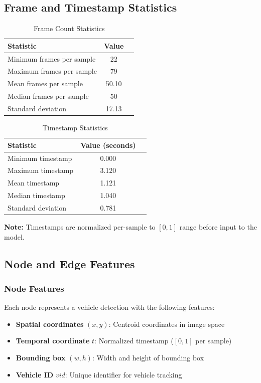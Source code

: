 \documentclass[11pt,a4paper]{article}
\begin{document}
\subsection{Frame and Timestamp Statistics}

\begin{table}[H]
\centering
\caption{Frame Count Statistics}
\begin{tabular}{lcc}
\toprule
\textbf{Statistic} & \textbf{Value} \\
\midrule
Minimum frames per sample & 22 \\
Maximum frames per sample & 79 \\
Mean frames per sample & 50.10 \\
Median frames per sample & 50 \\
Standard deviation & 17.13 \\
\bottomrule
\end{tabular}
\end{table}

\begin{table}[H]
\centering
\caption{Timestamp Statistics}
\begin{tabular}{lcc}
\toprule
\textbf{Statistic} & \textbf{Value (seconds)} \\
\midrule
Minimum timestamp & 0.000 \\
Maximum timestamp & 3.120 \\
Mean timestamp & 1.121 \\
Median timestamp & 1.040 \\
Standard deviation & 0.781 \\
\bottomrule
\end{tabular}
\end{table}

\textbf{Note:} Timestamps are normalized per-sample to $[0, 1]$ range before input to the model.

\subsection{Node and Edge Features}

\subsubsection{Node Features}

Each node represents a vehicle detection with the following features:
\begin{itemize}
    \item \textbf{Spatial coordinates} $(x, y)$: Centroid coordinates in image space
    \item \textbf{Temporal coordinate} $t$: Normalized timestamp ($[0, 1]$ per sample)
    \item \textbf{Bounding box} $(w, h)$: Width and height of bounding box
    \item \textbf{Vehicle ID} $vid$: Unique identifier for vehicle tracking
\end{itemize}
\end{document}
